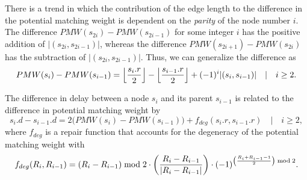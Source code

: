 There is a trend in which the contribution of the edge length to the difference in the potential matching weight is dependent on the \emph{parity} of the node number $i$. The difference $ PMW(s_{2i}) - PMW(s_{2i-1})$ for some integer $i$ has the positive addition of $|(s_{2i}, s_{2i-1})|$, whereas the difference $ PMW(s_{2i+1}) - PMW(s_{2i})$ has the subtraction of $|(s_{2i}, s_{2i-1})|$. Thus, we can generalize the difference as
\begin{equation}\label{eq:pmwdiff}
  PMW(s_i) - PMW(s_{i-1}) = {\left \lfloor \frac{s_i.r}{2} \right \rfloor } - {\left \lfloor \frac{s_{i-1}.r}{2} \right \rfloor } + (-1)^{i}\abs{(s_i,s_{i-1})} \hspace{1em} | \hspace{1em} i\geq 2.
\end{equation}

\begin{lemma}
  The difference in delay between a node $s_i$ and its parent $s_{i-1}$ is related to the difference in potential matching weight by 
  \begin{equation}\label{eq:delaydiff}
    s_i.d - s_{i-1}.d =2\big(PMW(s_i) - PMW(s_{i-1})\big) + f_{deg}(s_i.r, s_{i-1}.r) \hspace{1em} | \hspace{1em} i\geq 2,
  \end{equation}
  where $f_{deg}$ is a repair function that accounts for the degeneracy of the potential matching weight with
  \begin{equation}\label{eq:degenrepair}
    f_{deg}(R_i, R_{i-1}) = (R_i - R_{i-1}) \bmod 2 \cdot \left(\frac{R_i - R_{i-1}}{\abs{R_i - R_{i-1}}}\right) \cdot (-1)^{\left(\frac{R_i+R_{i-1}-1}{2}\right)\bmod 2} .
  \end{equation}
\end{lemma}
